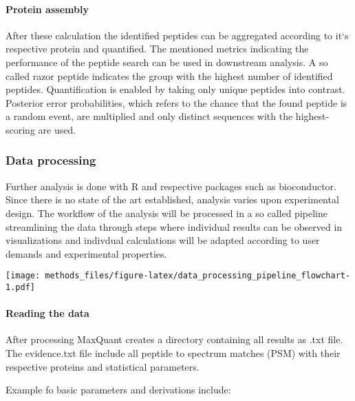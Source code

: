 \documentclass[
]{article}
\begin{document}
\hypertarget{protein-assembly}{%
\paragraph{Protein assembly}\label{protein-assembly}}

After these calculation the identified peptides can be aggregated
according to it`s respective protein and quantified. The mentioned
metrics indicating the performance of the peptide search can be used in
downstream analysis. A so called razor peptide indicates the group with
the highest number of identified peptides. Quantification is enabled by
taking only unique peptides into contrast. Posterior error
probabilities, which refers to the chance that the found peptide is a
random event, are multiplied and only distinct sequences with the
highest-scoring are used.

\hypertarget{data-processing}{%
\subsubsection{Data processing}\label{data-processing}}

Further analysis is done with R and respective packages such as
bioconductor. Since there is no state of the art established, analysis
varies upon experimental design. The workflow of the analysis will be
processed in a so called pipeline streamlining the data through steps
where individual results can be observed in visualizations and indivdual
calculations will be adapted according to user demands and experimental
properties.

\texttt{[image: methods\_files/figure-latex/data\_processing\_pipeline\_flowchart-1.pdf]}

\hypertarget{reading-the-data}{%
\paragraph{Reading the data}\label{reading-the-data}}

After processing MaxQuant creates a directory containing all results as
.txt file. The evidence.txt file include all peptide to spectrum matches
(PSM) with their respective proteins and statistical parameters.

Example fo basic parameters and derivations include:
\end{document}
